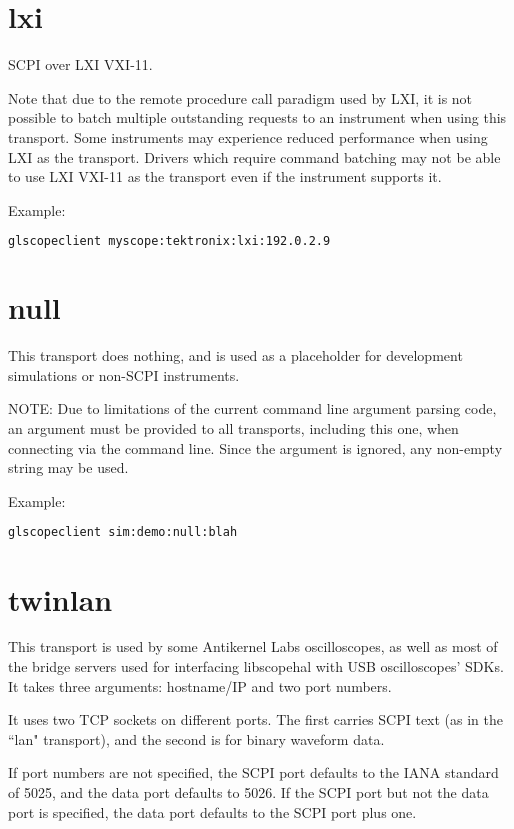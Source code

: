 \section{lxi}

SCPI over LXI VXI-11.

Note that due to the remote procedure call paradigm used by LXI, it is not possible to batch multiple outstanding
requests to an instrument when using this transport. Some instruments may experience reduced performance when using LXI
as the transport. Drivers which require command batching may not be able to use LXI VXI-11 as the transport even if the
instrument supports it.

Example:
\begin{lstlisting}[language=sh, numbers=none]
glscopeclient myscope:tektronix:lxi:192.0.2.9
\end{lstlisting}

\section{null}

This transport does nothing, and is used as a placeholder for development simulations or non-SCPI instruments.

NOTE: Due to limitations of the current command line argument parsing code, an argument must be provided to all
transports, including this one, when connecting via the command line. Since the argument is ignored, any non-empty
string may be used.

Example:
\begin{lstlisting}[language=sh, numbers=none]
glscopeclient sim:demo:null:blah
\end{lstlisting}

\section{twinlan}

This transport is used by some Antikernel Labs oscilloscopes, as well as most of the bridge servers used for interfacing
libscopehal with USB oscilloscopes' SDKs. It takes three arguments: hostname/IP and two port numbers.

It uses two TCP sockets on different ports. The first carries SCPI text (as in the ``lan" transport), and the second is
for binary waveform data.

If port numbers are not specified, the SCPI port defaults to the IANA standard of 5025, and the data port defaults to
5026. If the SCPI port but not the data port is specified, the data port defaults to the SCPI port plus one.

